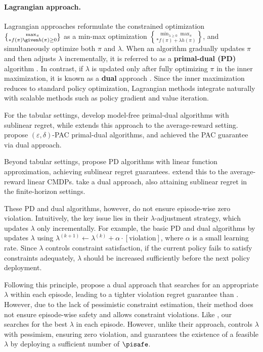 \paragraph{Lagrangian approach.}
Lagrangian approaches reformulate the constrained optimization\\ $\max_\pi \brace*{f(\pi) \given h(\pi) \geq 0}$ as a min-max optimization $\min_{\lambda \geq 0} \max_{\pi}\brace*{f(\pi) + \lambda h(\pi)}$, and simultaneously optimize both $\pi$ and $\lambda$.
When an algorithm gradually updates \(\pi\) and then adjusts \(\lambda\) incrementally, it is referred to as a \textbf{primal-dual (PD)} algorithm \citep{ding2023last}.  
In contrast, if \(\lambda\) is updated only after fully optimizing \(\pi\) in the inner maximization, it is known as a \textbf{dual} approach \citep{ying2022dual}.
Since the inner maximization reduces to standard policy optimization, Lagrangian methods integrate naturally with scalable methods such as policy gradient and value iteration.

For the tabular settings, \citet{wei2021provably,muller2024truly} develop model-free primal-dual algorithms with sublinear regret, while \citet{wei2022provably} extends this approach to the average-reward setting. 
\citet{zeng2022finite,kitamura2024policy} propose \((\varepsilon,\delta)\)-PAC primal-dual algorithms, and \citet{vaswani2022near} achieved the PAC guarantee via dual approach.

Beyond tabular settings, \citet{ding2021provably} propose PD algorithms with linear function approximation, achieving sublinear regret guarantees.
\citet{gosh2023achiving} extend this to the average-reward linear CMDPs.
\citet{ghosh2022provably} take a dual approach, also attaining sublinear regret in the finite-horizon settings.

These PD and dual algorithms, however, do not ensure episode-wise zero violation.
Intuitively, the key issue lies in their $\lambda$-adjustment strategy, which updates $\lambda$ only incrementally.
For example, the basic PD and dual algorithms by \citet{efroni2020exploration} updates $\lambda$ using $\lambda^{(k+1)} \leftarrow \lambda^{(k)} + \alpha \cdot [\text{violation}]$, where $\alpha$ is a small learning rate.
Since $\lambda$ controls constraint satisfaction, if the current policy fails to satisfy constraints adequately, $\lambda$ should be increased sufficiently before the next policy deployment.

Following this principle, \citet{ghosh2024towards} propose a dual approach that searches for an appropriate $\lambda$ within each episode, leading to a tighter violation regret guarantee than \citet{ghosh2022provably}.
However, due to the lack of pessimistic constraint estimation, their method does not ensure episode-wise safety and allows constraint violations.
Like \citet{ghosh2024towards}, our \MDPalgo searches for the best $\lambda$ in each episode.
However, unlike their approach, \MDPalgo controls $\lambda$ with pessimism, ensuring zero violation, and guarantees the existence of a feasible $\lambda$ by deploying a sufficient number of $\pisafe$.

